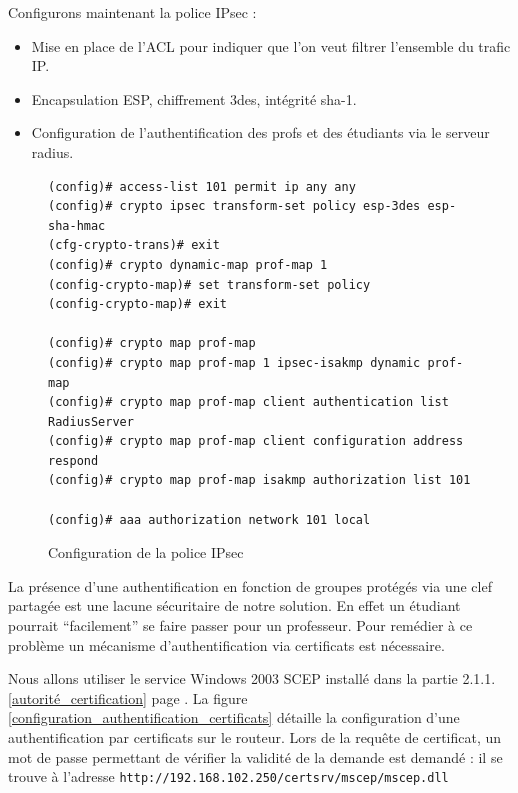 Configurons maintenant la police IPsec :
\begin{itemize}
	\item Mise en place de l'ACL pour indiquer que l'on veut filtrer l'ensemble du trafic IP.
	\item Encapsulation ESP, chiffrement 3des, intégrité sha-1.
	\item Configuration de l'authentification des profs et des étudiants via le serveur radius.
\end{itemize}

\begin{figure}[H]
	\begin{center}
		\begin{minipage}{1\textwidth}
			\begin{lstlisting}[frame=trBL]
(config)# access-list 101 permit ip any any
(config)# crypto ipsec transform-set policy esp-3des esp-sha-hmac
(cfg-crypto-trans)# exit
(config)# crypto dynamic-map prof-map 1
(config-crypto-map)# set transform-set policy
(config-crypto-map)# exit

(config)# crypto map prof-map
(config)# crypto map prof-map 1 ipsec-isakmp dynamic prof-map
(config)# crypto map prof-map client authentication list RadiusServer
(config)# crypto map prof-map client configuration address respond
(config)# crypto map prof-map isakmp authorization list 101

(config)# aaa authorization network 101 local
			\end{lstlisting}
		\end{minipage}
	\end{center}
	\caption{Configuration de la police IPsec}
	\label{configuration_police_ipsec}
\end{figure}

La présence d'une authentification en fonction de groupes protégés via une clef partagée est une lacune sécuritaire de notre solution. En effet un étudiant pourrait ``facilement'' se faire passer pour un professeur. Pour remédier à ce problème un mécanisme d'authentification via certificats est nécessaire.

Nous allons utiliser le service Windows 2003 SCEP installé dans la partie 2.1.1.\ref{autorité_certification} page \pageref{autorité_certification}. La figure \ref{configuration_authentification_certificats} détaille la configuration d'une authentification par certificats sur le routeur. Lors de la requête de certificat, un mot de passe permettant de vérifier la validité de la demande est demandé : il se trouve à l'adresse \verb|http://192.168.102.250/certsrv/mscep/mscep.dll|

